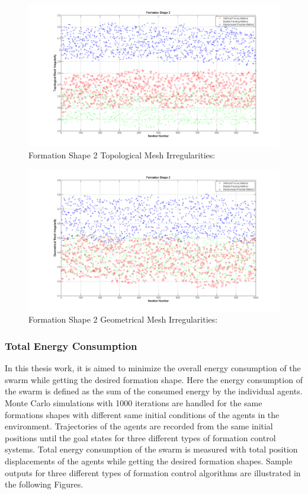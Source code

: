 				\begin{figure}[H]
					\caption{Formation Shape 2 Topological Mesh Irregularities:}
					\centerline{\includegraphics[scale = 0.45]{Topological_Irr_2}}
				\end{figure} 	
				
								\begin{figure}[H]
									\caption{Formation Shape 2 Geometrical Mesh Irregularities:}
									\centerline{\includegraphics[scale = 0.45]{Geometrical_Irr_2}}
								\end{figure} 	
		
		
		
		
		  \subsubsection{Total Energy Consumption} 
		
		In this thesis work, it is aimed to minimize the overall energy consumption of the swarm while getting the desired formation shape. Here the energy consumption of the swarm is defined as the sum of the consumed energy by the individual agents. Monte Carlo simulations with 1000 iterations are handled for the same formations shapes with different same initial conditions of the agents in the environment. 				Trajectories of the agents are recorded from the same initial positions until the goal states for three different types of formation control systems. Total energy consumption of the swarm is measured with total position displacements of the agents while getting the desired formation shapes. Sample outputs for three different types of formation control algorithms are illustrated in the following Figures.
		
